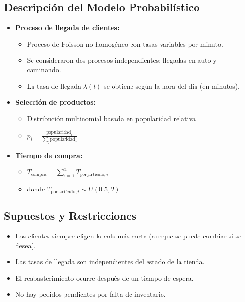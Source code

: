 \documentclass[12pt, a4paper]{article}
\begin{document}
\subsection{Descripción del Modelo Probabilístico}
\begin{itemize}
    \item \textbf{Proceso de llegada de clientes:}
    \begin{itemize}
        \item Proceso de Poisson no homogéneo con tasas variables por minuto.
        \item Se consideraron dos procesos independientes: llegadas en auto y caminando.
        \item La tasa de llegada $\lambda(t)$ se obtiene según la hora del día (en minutos).
    \end{itemize}

    \item \textbf{Selección de productos:}
    \begin{itemize}
        \item Distribución multinomial basada en popularidad relativa
        \item $p_i = \frac{\text{popularidad}_i}{\sum_j \text{popularidad}_j}$
    \end{itemize}

    \item \textbf{Tiempo de compra:}
    \begin{itemize}
        \item $T_{\text{compra}} = \sum_{i=1}^{n} T_{\text{por\_artículo},i}$
        \item donde $T_{\text{por\_artículo},i} \sim U(0.5, 2)$
        
    \end{itemize}
\end{itemize}

\subsection{Supuestos y Restricciones}
\begin{itemize}
    \item Los clientes siempre eligen la cola más corta (aunque se puede cambiar si se desea).
    \item Las tasas de llegada son independientes del estado de la tienda.
    \item El reabastecimiento ocurre después de un tiempo de espera.
    \item No hay pedidos pendientes por falta de inventario.
\end{itemize}
\end{document}
